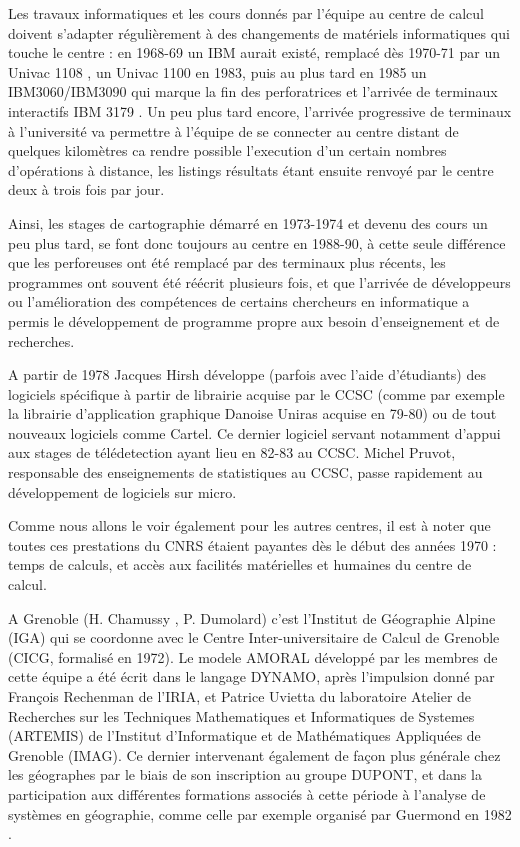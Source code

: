 Les travaux informatiques et les cours donnés par l'équipe au centre de calcul doivent s'adapter régulièrement à des changements de matériels informatiques qui touche le centre : en 1968-69 un IBM aurait existé, remplacé dès 1970-71  par un Univac 1108 \textcite{Dalmasso1971}, un Univac 1100 en 1983, puis au plus tard en 1985 un IBM3060/IBM3090 qui marque la fin des perforatrices et l'arrivée de terminaux interactifs IBM 3179 \autocites{Rimbert1984,Cauvin1986}. Un peu plus tard encore, l'arrivée progressive de terminaux à l'université va permettre à l'équipe de se connecter au centre distant de quelques kilomètres ca rendre possible l'execution d'un certain nombres d'opérations à distance, les listings résultats étant ensuite renvoyé par le centre deux à trois fois par jour.

Ainsi, les stages de cartographie démarré en 1973-1974 et devenu des cours un peu plus tard, se font donc toujours au centre en 1988-90, à cette seule différence que les perforeuses ont été remplacé par des terminaux plus récents, les programmes ont souvent été réécrit plusieurs fois, et que l'arrivée de développeurs ou l'amélioration des compétences de certains chercheurs en informatique a permis le développement de programme propre aux besoin d'enseignement et de recherches.

A partir de 1978 Jacques Hirsh développe (parfois avec l'aide d'étudiants) des logiciels spécifique à partir de librairie acquise par le CCSC (comme par exemple la librairie d'application graphique Danoise Uniras acquise en 79-80) ou de tout nouveaux logiciels comme Cartel. Ce dernier logiciel servant notamment d'appui aux stages de télédetection ayant lieu en 82-83 au CCSC. Michel Pruvot, responsable des enseignements de statistiques au CCSC, passe rapidement au développement de logiciels sur micro.


Comme nous allons le voir également pour les autres centres, il est à noter que toutes ces prestations du CNRS étaient payantes dès le début des années 1970 : temps de calculs, et accès aux facilités matérielles et humaines du centre de calcul.

A Grenoble (H. Chamussy , P. Dumolard) c’est l’Institut de Géographie Alpine (IGA) qui se coordonne avec le Centre Inter-universitaire de Calcul de Grenoble (CICG, formalisé en 1972). Le modele AMORAL développé par les membres de cette équipe a été écrit dans le langage DYNAMO, après l'impulsion  donné par François Rechenman de l'IRIA, et Patrice Uvietta du laboratoire Atelier de Recherches sur les Techniques Mathematiques et Informatiques de Systemes (ARTEMIS) de l’Institut d'Informatique et de Mathématiques Appliquées de Grenoble (IMAG). Ce dernier intervenant également de façon plus générale chez les géographes par le biais de son inscription au groupe DUPONT, et dans la participation aux différentes formations associés à cette période à l'analyse de systèmes en géographie, comme celle par exemple organisé par Guermond en 1982 \autocite{Guermond1984}. 

